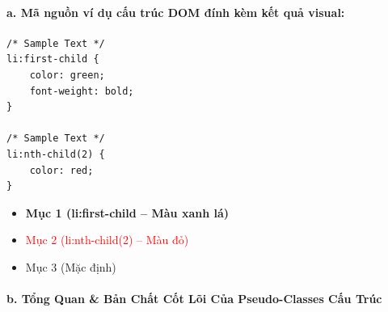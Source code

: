 \paragraph{a. Mã nguồn ví dụ cấu trúc DOM đính kèm kết quả visual:}

\begin{codeWindow}
\begin{lstlisting}[language=CSS3]
/* Sample Text */
li:first-child {
    color: green;
    font-weight: bold;
}

/* Sample Text */
li:nth-child(2) {
    color: red;
}
\end{lstlisting}
\end{codeWindow}

\begin{browserWindow}
\sffamily\small
\begin{itemize}[leftmargin=1.5em, itemsep=2pt, parsep=0pt]
    \item \textcolor{green!70!black}{\textbf{Mục 1 (li:first-child -- Màu xanh lá)}}
    \item \textcolor{red}{Mục 2 (li:nth-child(2) -- Màu đỏ)}
    \item Mục 3 (Mặc định)
\end{itemize}
\end{browserWindow}

\paragraph{b. Tổng Quan \& Bản Chất Cốt Lõi Của Pseudo-Classes Cấu Trúc}

